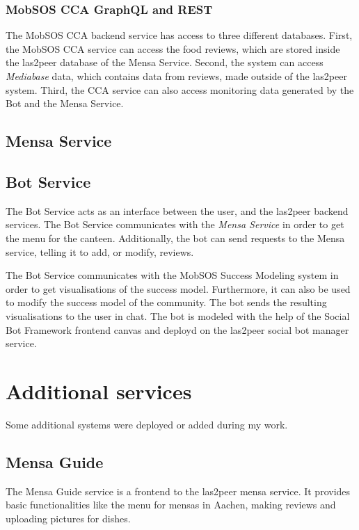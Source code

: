 \subsubsection{MobSOS CCA GraphQL and REST}
The MobSOS CCA backend service has access to three different databases. First, the MobSOS CCA service can access the food reviews, which are stored inside the las2peer database of the Mensa Service. Second, the system can access \emph{Mediabase} data, which contains data from reviews, made outside of the las2peer system. 
Third, the CCA service can also access monitoring data generated by the Bot and the Mensa Service. 

\subsection{Mensa Service}

\subsection{Bot Service}

The Bot Service acts as an interface between the user, and the las2peer backend services.
The Bot Service communicates with the \emph{Mensa Service} in order to get the menu for the canteen. Additionally, the bot can send requests to the Mensa service, telling it to add, or modify, reviews.

The Bot Service communicates with the MobSOS Success Modeling system in order to get visualisations of the success model. Furthermore, it can also be used to modify the success model of the community. 
The bot sends the resulting visualisations to the user in chat.
The bot is modeled with the help of the Social Bot Framework frontend canvas and deployd on the las2peer social bot manager service.



\section{Additional services}
Some additional systems were deployed or added during my work.

\subsection{Mensa Guide}
The Mensa Guide service is a frontend to the las2peer mensa service. It provides basic functionalities like the menu for mensas in Aachen, making reviews and uploading pictures for dishes.

